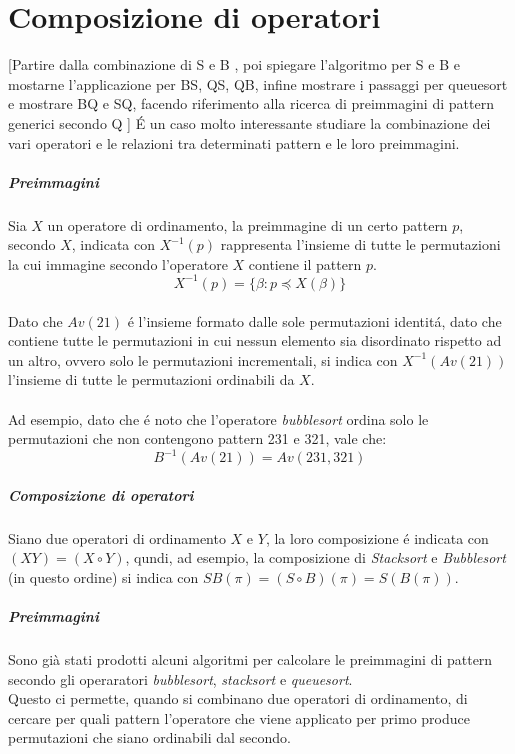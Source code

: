 \chapter{Composizione di operatori}
[Partire dalla combinazione di S e B \cite{albert2010inverse}, poi spiegare l'algoritmo per S e B \cite{claesson2012sorting} e mostarne l'applicazione per BS, QS, QB, infine mostrare i passaggi per queuesort e mostrare BQ e SQ, facendo riferimento alla ricerca di preimmagini di pattern generici secondo Q \cite{magnusson2013sorting}]
\'E un caso molto interessante studiare la combinazione dei vari operatori e le relazioni tra determinati pattern e le loro preimmagini.\\
\paragraph*{Preimmagini} Sia $X$ un operatore di ordinamento, la preimmagine di un certo pattern $p$, secondo $X$, indicata con $X^{-1}(p)$ rappresenta l'insieme di tutte le permutazioni la cui immagine secondo l'operatore $X$ contiene il pattern $p$.$$X^{-1}(p) = \{\beta : p\preceq X(\beta)\}$$\\
Dato che $Av(21)$ \'e l'insieme formato dalle sole permutazioni identit\'a, dato che contiene tutte le permutazioni in cui nessun elemento sia disordinato rispetto ad un altro, ovvero solo le permutazioni incrementali, si indica con $X^{-1}(Av(21))$ l'insieme di tutte le permutazioni ordinabili da $X$.\\\\
Ad esempio, dato che \'e noto che l'operatore \textit{bubblesort} ordina solo le permutazioni che non contengono pattern 231 e 321, vale che:$$B^{-1}(Av(21)) = Av(231,321)$$
\paragraph*{Composizione di operatori} Siano due operatori di ordinamento $X$ e $Y$, la loro composizione \'e indicata con $( XY ) = ( X \circ Y )$, qundi, ad esempio, la composizione di \textit{Stacksort} e \textit{Bubblesort} (in questo ordine) si indica con $SB(\pi) = (S \circ B)(\pi) = S(B(\pi))$.
\paragraph*{Preimmagini} Sono già stati prodotti alcuni algoritmi per calcolare le preimmagini di pattern secondo gli operaratori \textit{bubblesort}\cite{albert2010inverse}, \textit{stacksort}\cite{claesson2012sorting} e \textit{queuesort}\cite{magnusson2013sorting}.\\
Questo ci permette, quando si combinano due operatori di ordinamento, di cercare per quali pattern l'operatore che viene applicato per primo produce permutazioni che siano ordinabili dal secondo.
